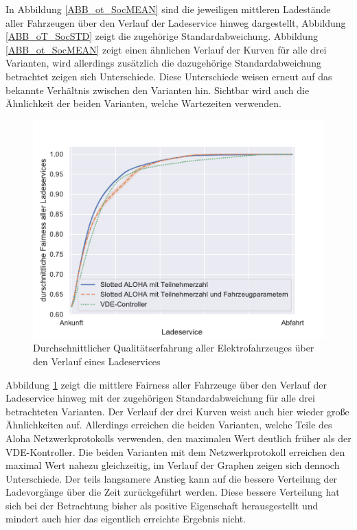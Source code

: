 In Abbildung \ref{ABB_ot_SocMEAN} sind die jeweiligen mittleren Ladestände aller Fahrzeugen über den Verlauf der Ladeservice hinweg dargestellt, Abbildung \ref{ABB_oT_SocSTD} zeigt die zugehörige Standardabweichung. Abbildung \ref{ABB_ot_SocMEAN} zeigt einen ähnlichen Verlauf der Kurven für alle drei Varianten, wird allerdings zusätzlich die dazugehörige Standardabweichung betrachtet zeigen sich Unterschiede. Diese Unterschiede weisen erneut auf das bekannte Verhältnis zwischen den Varianten hin. Sichtbar wird auch die Ähnlichkeit der beiden Varianten, welche Wartezeiten verwenden.
\begin{figure}[htb]
\centering
	\includegraphics[scale=0.6]{img/ohneTrafo/SlottedAloha_participants_VDE_tau_15_qoe.pdf}
	\caption{Durchschnittlicher Qualitätserfahrung aller Elektrofahrzeuges über den Verlauf eines Ladeservices}
	\label{Abb_oT_Fairness}
\end{figure}
Abbildung \ref{Abb_oT_Fairness} zeigt die mittlere Fairness aller Fahrzeuge über den Verlauf der Ladeservice hinweg mit der zugehörigen Standardabweichung für alle drei betrachteten Varianten. Der Verlauf der drei Kurven weist auch hier wieder große Ähnlichkeiten auf. Allerdings erreichen die beiden Varianten, welche Teile des Aloha Netzwerkprotokolls verwenden, den maximalen Wert deutlich früher als der VDE-Kontroller. Die beiden Varianten mit dem Netzwerkprotokoll erreichen den maximal Wert nahezu gleichzeitig, im Verlauf der Graphen zeigen sich dennoch Unterschiede. Der teils langsamere Anstieg kann auf die bessere Verteilung der Ladevorgänge über die Zeit zurückgeführt werden. Diese bessere Verteilung hat sich bei der Betrachtung bisher als positive Eigenschaft herausgestellt und mindert auch hier das eigentlich erreichte Ergebnis nicht.
